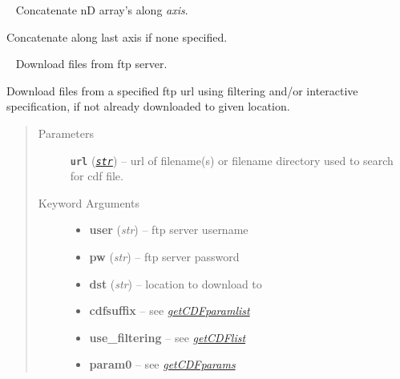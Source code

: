 \documentclass[letterpaper,10pt,english]{sphinxhowto}
\begin{document}

\begin{fulllineitems}
\label{swtools_doc:swtools.concatenate_values}~\label{swtools_doc:concatenate-values}
Concatenate nD array's along \emph{axis}.

Concatenate along last axis if none specified.

\end{fulllineitems}


\begin{fulllineitems}
\label{swtools_doc:swtools.dl_ftp}~\label{swtools_doc:dl-ftp}
Download files from ftp server.

Download files from a specified ftp url using filtering and/or
interactive specification, if not already downloaded to given location.
\begin{quote}\begin{description}
\item[{Parameters}] \leavevmode
\textbf{\texttt{url}} (\href{https://docs.python.org/library/functions.html\#str}{\emph{\texttt{str}}}) -- url of filename(s) or filename directory used to search for cdf file.

\item[{Keyword Arguments}] \leavevmode\begin{itemize}
\item {} 
\textbf{user} (\emph{str}) --
ftp server username

\item {} 
\textbf{pw} (\emph{str}) --
ftp server password

\item {} 
\textbf{dst} (\emph{str}) --
location to download to

\item {} 
\textbf{cdfsuffix} --
see {\hyperref[swtools_doc:getcdfparamlist]{\emph{getCDFparamlist}}}

\item {} 
\textbf{use\_filtering} --
see {\hyperref[swtools_doc:getcdflist]{\emph{getCDFlist}}}

\item {} 
\textbf{param0} --
see {\hyperref[swtools_doc:getcdfparams]{\emph{getCDFparams}}}


\end{itemize}
\end{description}
\end{quote}
\end{fulllineitems}
\end{document}
